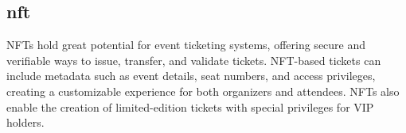 \subsection{\gls{nft}}
\label{subsec:nfts}

NFTs hold great potential for event ticketing systems, offering secure and
verifiable ways to issue, transfer, and validate tickets. NFT-based tickets can
include metadata such as event details, seat numbers, and access privileges,
creating a customizable experience for both organizers and attendees. NFTs also
enable the creation of limited-edition tickets with special privileges for VIP
holders.
